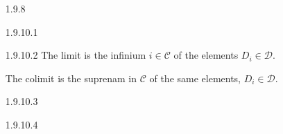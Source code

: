 \documentclass{article}
\begin{document}
\begin{enumerate}
\item[1.9.8]

\item[]
\item[1.9.10.1]
\item[]
\item[1.9.10.2]
  The limit is the infinium $i\in \mathcal{C}$
  of the elements $D_i\in \mathcal{D}$.

  The colimit is the suprenam in $\mathcal{C}$ of
  the same elements, $D_i \in \mathcal{D}$.

\item[]
\item[1.9.10.3]
\item[]
\item[1.9.10.4]
\end{enumerate}
\end{document}
